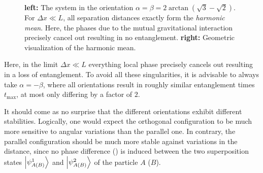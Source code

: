 \begin{figure}[!htbp]
  \centering
  \def\svgwidth{\textwidth}
  
  \caption{\textbf{left:} The system in the orientation $\alpha=\beta=2\arctan(\sqrt{3}-\sqrt{2})$. For $\Delta x \ll L$, all separation distances exactly form the \textit{harmonic mean}. Here, the phases due to the mutual gravitational interaction precisely cancel out resulting in no entanglement. \textbf{right:} Geometric visualization of the harmonic mean.}
  \label{fig:4:harmonic-mean}
\end{figure}
Here, in the limit $\Delta x \ll L$ everything local phase precisely cancels out resulting in a loss of entanglement. 
To avoid all these singularities, it is advisable to always take $\alpha=-\beta$, where all orientations result in roughly similar entanglement times $t_\mathrm{max}$, at most only differing by a factor of $2$.

It should come as no surprise that the different orientations exhibit different stabilities. Logically, one would expect the orthogonal configuration to be much more sensitive to angular variations than the parallel one.
In contrary, the parallel configuration should be much more stable against variations in the distance, since no phase difference () is induced between the two superposition states $\ket{\psi^1_{A(B)}}$ and $\ket{\psi^2_{A(B)}}$ of the particle $A$ ($B$).

